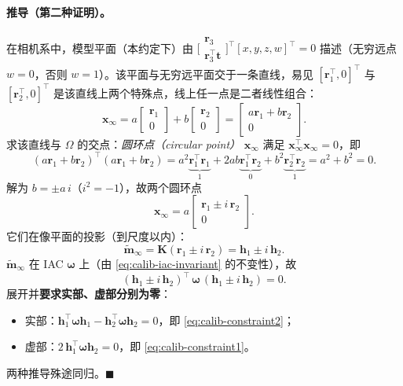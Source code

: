 \paragraph{推导（第二种证明）。}
在相机系中，模型平面（本约定下）由 $\big[\begin{smallmatrix}\mathbf{r}_3\\\mathbf{r}_3^\top\mathbf{t}\end{smallmatrix}\big]^\top[x,y,z,w]^\top=0$ 描述（无穷远点 $w=0$，否则 $w=1$）\cite{zhang2000calibration}。该平面与无穷远平面交于一条直线，易见 $[\mathbf{r}_1^\top,0]^\top$ 与 $[\mathbf{r}_2^\top,0]^\top$ 是该直线上两个特殊点，线上任一点是二者线性组合：
\begin{equation}
  \mathbf{x}_\infty=a\begin{bmatrix}\mathbf{r}_1\\0\end{bmatrix}+b\begin{bmatrix}\mathbf{r}_2\\0\end{bmatrix}=\begin{bmatrix}a\mathbf{r}_1+b\mathbf{r}_2\\0\end{bmatrix}.
\end{equation}
求该直线与 $\Omega$ 的交点：\emph{圆环点（circular point）} $\mathbf{x}_\infty$ 满足 $\mathbf{x}_\infty^\top\mathbf{x}_\infty=0$，即
\begin{equation}
  (a\mathbf{r}_1+b\mathbf{r}_2)^\top(a\mathbf{r}_1+b\mathbf{r}_2)=a^2\underbrace{\mathbf{r}_1^\top\mathbf{r}_1}_{1}+2ab\underbrace{\mathbf{r}_1^\top\mathbf{r}_2}_{0}+b^2\underbrace{\mathbf{r}_2^\top\mathbf{r}_2}_{1}=a^2+b^2=0.
\end{equation}
解为 $b=\pm a\,i$（$i^2=-1$），故两个圆环点
\begin{equation}
  \mathbf{x}_\infty=a\begin{bmatrix}\mathbf{r}_1\pm i\,\mathbf{r}_2\\0\end{bmatrix}.
\end{equation}
它们在像平面的投影（到尺度以内）：
\begin{equation}
  \tilde{\mathbf{m}}_\infty=\mathbf{K}(\mathbf{r}_1\pm i\,\mathbf{r}_2)=\mathbf{h}_1\pm i\,\mathbf{h}_2.
\end{equation}
$\tilde{\mathbf{m}}_\infty$ 在 IAC $\boldsymbol{\omega}$ 上（由 \cref{eq:calib-iac-invariant} 的不变性），故
\begin{equation}
  (\mathbf{h}_1\pm i\,\mathbf{h}_2)^\top\,\boldsymbol{\omega}\,(\mathbf{h}_1\pm i\,\mathbf{h}_2)=0.
\end{equation}
展开并\textbf{要求实部、虚部分别为零}：
\begin{itemize}
  \item 实部：$\mathbf{h}_1^\top\boldsymbol{\omega}\mathbf{h}_1-\mathbf{h}_2^\top\boldsymbol{\omega}\mathbf{h}_2=0$，即 \cref{eq:calib-constraint2}；
  \item 虚部：$2\,\mathbf{h}_1^\top\boldsymbol{\omega}\mathbf{h}_2=0$，即 \cref{eq:calib-constraint1}。
\end{itemize}
两种推导殊途同归。$\blacksquare$

